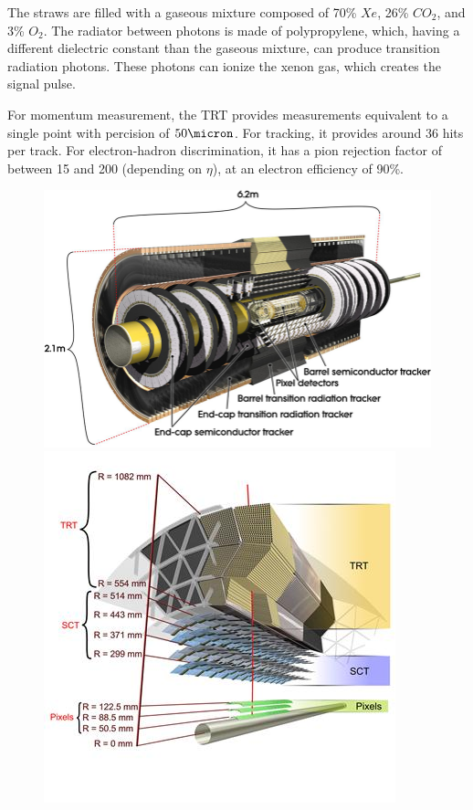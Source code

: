 The straws are filled with a gaseous mixture composed of 70\% $Xe$, 26\% $CO_2$, and 3\% $O_2$. The radiator between photons is made of polypropylene, which, having a different dielectric constant than the gaseous mixture, can produce transition radiation photons. These photons can ionize the xenon gas, which creates the signal pulse.


For momentum measurement, the \gls{TRT} provides measurements equivalent to a single point with percision of $\unit{50}{\micron}$. For tracking, it provides around 36 hits per track. For electron-hadron discrimination, it has a pion rejection factor of between 15 and 200 (depending on $\eta$), at an electron efficiency of 90\%.


\begin{figure}[!thp]
    \begin{minipage}[c]{.53\textwidth}
        \includegraphics[width=\textwidth]{chapters/chapter2_experiment/images/id_slice.png}
    \end{minipage}
    \begin{minipage}[c]{.45\textwidth}
        \includegraphics[width=\textwidth]{chapters/chapter2_experiment/images/id_layer.jpg} 

\end{minipage}
\end{figure}
